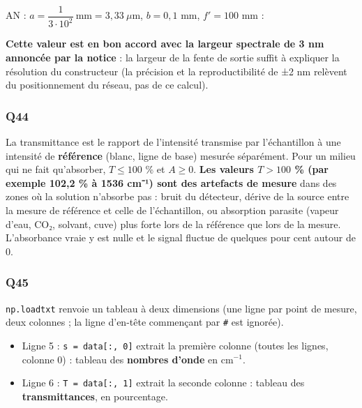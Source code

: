 \documentclass[11pt,a4paper]{article}
\providecommand{\tightlist}{\setlength{\itemsep}{0pt}\setlength{\parskip}{0pt}}
\newcommand{\equationajustee}[1]{%
  \sbox{\boiteequation}{$\displaystyle #1$}%
  \ifdim\wd\boiteequation>\linewidth
    \[\resizebox{\linewidth}{!}{\usebox{\boiteequation}}\]%
  \else
    \[#1\]%
  \fi}
\begin{document}
\equationajustee{\boxed{\Delta\lambda = \frac{ab}{f'}}}

AN : \(a = \dfrac{1}{3\cdot10^2}\ \mathrm{mm} = 3{,}33\ \mu\mathrm{m}\), \(b = 0{,}1\) mm, \(f' = 100\) mm :

\equationajustee{\Delta\lambda = \frac{3{,}33\cdot10^{-3} \times 0{,}1}{100}\ \mathrm{mm}}

\equationajustee{\boxed{\Delta\lambda \approx 3{,}3\ \mathrm{nm}}}

\textbf{Cette valeur est en bon accord avec la largeur spectrale de 3 nm annoncée par la notice} : la largeur de la fente de sortie suffit à expliquer la résolution du constructeur (la précision et la reproductibilité de ±2 nm relèvent du positionnement du réseau, pas de ce calcul).

\hypertarget{q44}{%
\subsubsection{Q44}\label{q44}}

La transmittance est le rapport de l'intensité transmise par l'échantillon à une intensité de \textbf{référence} (blanc, ligne de base) mesurée séparément. Pour un milieu qui ne fait qu'absorber, \(T \le 100\) \% et \(A \ge 0\). \textbf{Les valeurs \(T > 100\) \% (par exemple 102,2 \% à 1536 cm⁻¹) sont des artefacts de mesure} dans des zones où la solution n'absorbe pas : bruit du détecteur, dérive de la source entre la mesure de référence et celle de l'échantillon, ou absorption parasite (vapeur d'eau, CO₂, solvant, cuve) plus forte lors de la référence que lors de la mesure. L'absorbance vraie y est nulle et le signal fluctue de quelques pour cent autour de 0.

\hypertarget{q45}{%
\subsubsection{Q45}\label{q45}}

\texttt{np.loadtxt} renvoie un tableau à deux dimensions (une ligne par point de mesure, deux colonnes ; la ligne d'en-tête commençant par \texttt{\#} est ignorée).

\begin{itemize}
\tightlist
\item
  Ligne 5 : \texttt{s\ =\ data{[}:,\ 0{]}} extrait la première colonne (toutes les lignes, colonne 0) : tableau des \textbf{nombres d'onde} en \(\mathrm{cm^{-1}}\).
\item
  Ligne 6 : \texttt{T\ =\ data{[}:,\ 1{]}} extrait la seconde colonne : tableau des \textbf{transmittances}, en pourcentage.
\end{itemize}
\end{document}
